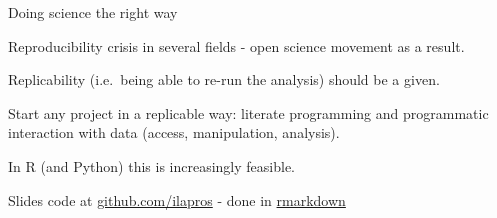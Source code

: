 \documentclass[
  10pt,
  ignorenonframetext,
  compress]{beamer}
\begin{document}
\begin{frame}{Doing science the right way}
\protect\hypertarget{doing-science-the-right-way}{}

Reproducibility crisis in several fields - open science movement as a
result.

Replicability (i.e.~being able to re-run the analysis) should be a
given.

Start any project in a replicable way: literate programming and
programmatic interaction with data (access, manipulation, analysis).

In R (and Python) this is increasingly feasible.

Slides code at
\href{https://github.com/ilapros/PerugiaSummerSchool/tree/master/July2020}{github.com/ilapros}
- done in \href{https://rmarkdown.rstudio.com/}{rmarkdown}

\end{frame}
\end{document}
